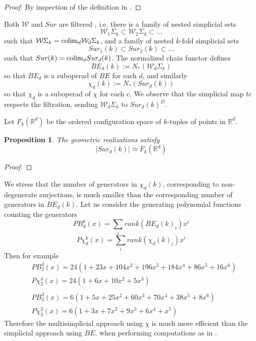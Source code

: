 \documentclass[a4paper,11pt]{article}
\newtheorem{proposition}[theorem]{Proposition}
\theoremstyle{remark}
\theoremstyle{definition}
\newcommand{\R}{\mathbb{R}}
\begin{document}
\begin{proof}
By inspection of the definition in \cite{BFsmall}. %
\end{proof}

Both $\mathcal{W}$ and $Sur$ are filtered \cite{BFsmall}, i.e.
there is a family of nested simplicial sets $$\mathcal{W}_1\Sigma_k \subset \mathcal{W}_2 \Sigma_k
 \subset \dots $$ such that 
$\mathcal{W}\Sigma_k={\rm colim}_d \mathcal{W}_d\Sigma_k$, and a family of nested $k$-fold simplicial sets
$$Sur_1(k) \subset Sur_2(k)  \subset \dots $$ such that $Sur(k) = {\rm colim}_d Sur_d(k)$.
The normalized chain functor defines $$BE_d(k):=N_*(\mathcal{W}_d \Sigma_k)$$ so that $BE_d$ 
is a suboperad of $BE$ for each $d$, and similarly $$\chi_d(k):=N_*(Sur_d(k))$$ so that 
$\chi_d$ is a suboperad of $\chi$ for each $c$.
We observe that the simplicial map $tc$ respects the filtration, sending 
$\mathcal{W}_d\Sigma_k$ to $Sur_d(k)^D$. 


Let  $F_k(\R^{d})$ be the ordered configuration space of $k$-tuples of points in  $\R^{d}$. 

\begin{proposition}
The geometric realizations satisfy 
$$|Sur_d(k)|  \simeq F_k(\R^{d})$$
\end{proposition}

\begin{proof}

\end{proof}


We stress that the number of generators in $\chi_d(k)$, corresponding to non-degenerate surjections,
is much smaller than the corresponding number of generators in $BE_d(k)$. 
Let us consider the generating polynomial functions counting the generators
$$PB_d^k(x) = \sum_i rank(BE_d(k)_i) x^i $$ $$P\chi_d^k(x)=
\sum_i rank(\chi_d(k)_i) x^i$$   
Then for example 
\begin{align*}
& PB_2^4(x)=24(1+23x+104x^2+196x^3+184x^4+86x^5+16x^6)\\
& P\chi_2^4(x)=24(1+6x+10x^2+5x^3) \\
& \\
& PB_3^3(x) = 6(1+5x+25x^2+60x^3+70x^4+38x^5+8x^6 ) \\
&  P\chi_3^3(x)= 6(1+3x+7x^2+9x^3+6x^4+x^5)
\end{align*} 
Therefore the multisimplicial approach using $\chi$ is much more efficient than the simplicial
approach using $BE$, when performing computations as in \cite{formality}. 
\end{document}
